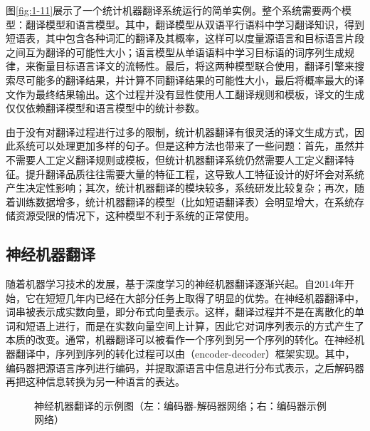 \parinterval 图\ref{fig:1-11}展示了一个统计机器翻译系统运行的简单实例。整个系统需要两个模型：翻译模型和语言模型。其中，翻译模型从双语平行语料中学习翻译知识，得到短语表，其中包含各种词汇的翻译及其概率，这样可以度量源语言和目标语言片段之间互为翻译的可能性大小；语言模型从单语语料中学习目标语的词序列生成规律，来衡量目标语言译文的流畅性。最后，将这两种模型联合使用，翻译引擎来搜索尽可能多的翻译结果，并计算不同翻译结果的可能性大小，最后将概率最大的译文作为最终结果输出。这个过程并没有显性使用人工翻译规则和模板，译文的生成仅仅依赖翻译模型和语言模型中的统计参数。

\parinterval 由于没有对翻译过程进行过多的限制，统计机器翻译有很灵活的译文生成方式，因此系统可以处理更加多样的句子。但是这种方法也带来了一些问题：首先，虽然并不需要人工定义翻译规则或模板，但统计机器翻译系统仍然需要人工定义翻译特征。提升翻译品质往往需要大量的特征工程，这导致人工特征设计的好坏会对系统产生决定性影响；其次，统计机器翻译的模块较多，系统研发比较复杂；再次，随着训练数据增多，统计机器翻译的模型（比如短语翻译表）会明显增大，在系统存储资源受限的情况下，这种模型不利于系统的正常使用。


\subsection{神经机器翻译}

\parinterval 随着机器学习技术的发展，基于深度学习的神经机器翻译逐渐兴起。自2014年开始，它在短短几年内已经在大部分任务上取得了明显的优势\cite{NIPS2014_5346,bahdanau2014neural}。在神经机器翻译中，词串被表示成实数向量，即分布式向量表示。这样，翻译过程并不是在离散化的单词和短语上进行，而是在实数向量空间上计算，因此它对词序列表示的方式产生了本质的改变。通常，机器翻译可以被看作一个序列到另一个序列的转化。在神经机器翻译中，序列到序列的转化过程可以由{\small{}}（encoder-decoder）框架实现。其中，编码器把源语言序列进行编码，并提取源语言中信息进行分布式表示，之后解码器再把这种信息转换为另一种语言的表达。

\begin{figure}[htp]
    \centering

    \caption{神经机器翻译的示例图（左：编码器-解码器网络；右：编码器示例网络）}
    \label{fig:1-12}
\end{figure}

